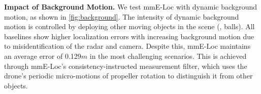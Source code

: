 \textbf{Impact of Background Motion.}
We test mmE-Loc with dynamic background motion, as shown in \fig \ref{fig:background}. 
The intensity of dynamic background motion is controlled by deploying other moving objects in the scene (\eg, balls).
All baselines show higher localization errors with increasing background motion due to misidentification of the radar and camera.
Despite this, mmE-Loc maintains an average error of 0.129$m$ in the most challenging scenarios.
This is achieved through mmE-Loc’s consistency-instructed measurement filter, which uses the drone’s periodic micro-motions of propeller rotation to distinguish it from other objects.

